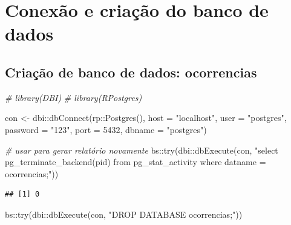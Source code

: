 \documentclass[
]{article}
\newenvironment{Shaded}{\begin{snugshade}}{\end{snugshade}}
\newcommand{\AttributeTok}[1]{\textcolor[rgb]{0.77,0.63,0.00}{#1}}
\newcommand{\CommentTok}[1]{\textcolor[rgb]{0.56,0.35,0.01}{\textit{#1}}}
\newcommand{\DecValTok}[1]{\textcolor[rgb]{0.00,0.00,0.81}{#1}}
\newcommand{\FunctionTok}[1]{\textcolor[rgb]{0.00,0.00,0.00}{#1}}
\newcommand{\NormalTok}[1]{#1}
\newcommand{\OtherTok}[1]{\textcolor[rgb]{0.56,0.35,0.01}{#1}}
\newcommand{\SpecialCharTok}[1]{\textcolor[rgb]{0.00,0.00,0.00}{#1}}
\newcommand{\StringTok}[1]{\textcolor[rgb]{0.31,0.60,0.02}{#1}}
\begin{document}
\hypertarget{conexuxe3o-e-criauxe7uxe3o-do-banco-de-dados}{%
\section{Conexão e criação do banco de
dados}\label{conexuxe3o-e-criauxe7uxe3o-do-banco-de-dados}}

\hypertarget{criauxe7uxe3o-de-banco-de-dados-ocorrencias}{%
\subsection{Criação de banco de dados:
ocorrencias}\label{criauxe7uxe3o-de-banco-de-dados-ocorrencias}}

\begin{Shaded}
\begin{Highlighting}[]
\CommentTok{\# library(DBI)}
\CommentTok{\# library(RPostgres)}

\NormalTok{con }\OtherTok{\textless{}{-}}\NormalTok{ dbi}\SpecialCharTok{::}\FunctionTok{dbConnect}\NormalTok{(rp}\SpecialCharTok{::}\FunctionTok{Postgres}\NormalTok{(),}
                 \AttributeTok{host =} \StringTok{"localhost"}\NormalTok{,}
                 \AttributeTok{user =} \StringTok{"postgres"}\NormalTok{,}
                 \AttributeTok{password =} \StringTok{"123"}\NormalTok{,}
                 \AttributeTok{port =} \DecValTok{5432}\NormalTok{,}
                 \AttributeTok{dbname =} \StringTok{"postgres"}\NormalTok{)}

\CommentTok{\# usar para gerar relatório novamente}
\NormalTok{bs}\SpecialCharTok{::}\FunctionTok{try}\NormalTok{(dbi}\SpecialCharTok{::}\FunctionTok{dbExecute}\NormalTok{(con, }\StringTok{"select pg\_terminate\_backend(pid)}
\StringTok{                        from pg\_stat\_activity}
\StringTok{                        where datname = \textquotesingle{}ocorrencias\textquotesingle{};"}\NormalTok{))}
\end{Highlighting}
\end{Shaded}

\begin{verbatim}
## [1] 0
\end{verbatim}

\begin{Shaded}
\begin{Highlighting}[]
\NormalTok{bs}\SpecialCharTok{::}\FunctionTok{try}\NormalTok{(dbi}\SpecialCharTok{::}\FunctionTok{dbExecute}\NormalTok{(con, }\StringTok{"DROP DATABASE ocorrencias;"}\NormalTok{))}
\end{Highlighting}
\end{Shaded}
\end{document}
